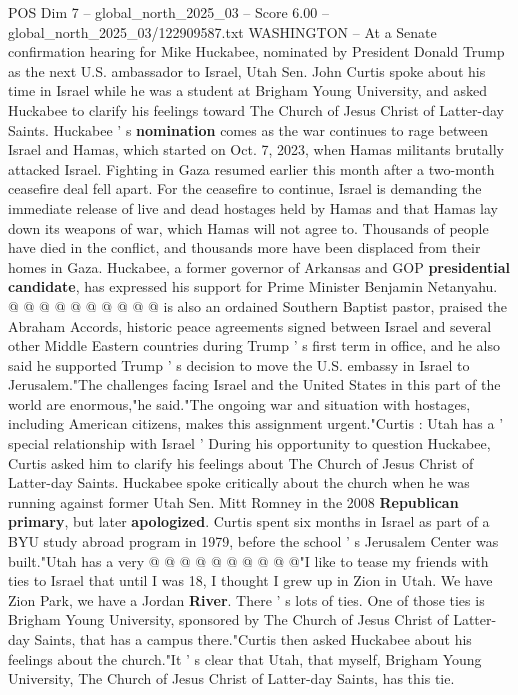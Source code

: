 \begin{textsample}{POS Dim 7 – global\_north\_2025\_03 – Score 6.00 – global\_north\_2025\_03/122909587.txt}  \label{ex:f7_pos_319}
WASHINGTON -- At a Senate confirmation hearing for Mike Huckabee, nominated by President Donald Trump as the next U.S. ambassador to Israel, Utah Sen.
John Curtis spoke about his time in Israel while he was a student at Brigham Young University, and asked Huckabee to clarify his feelings toward The Church of Jesus Christ of Latter-day Saints.
Huckabee ' s \textbf{nomination} comes as the war continues to rage between Israel and Hamas, which started on Oct. 7, 2023, when Hamas militants brutally attacked Israel.
Fighting in Gaza resumed earlier this month after a two-month ceasefire deal fell apart.
For the ceasefire to continue, Israel is demanding the immediate release of live and dead hostages held by Hamas and that Hamas lay down its weapons of war, which Hamas will not agree to.
Thousands of people have died in the conflict, and thousands more have been displaced from their homes in Gaza.
Huckabee, a former governor of Arkansas and GOP \textbf{presidential} \textbf{candidate}, has expressed his support for Prime Minister Benjamin Netanyahu. @ @ @ @ @ @ @ @ @ @ is also an ordained Southern Baptist pastor, praised the Abraham Accords, historic peace agreements signed between Israel and several other Middle Eastern countries during Trump ' s first term in office, and he also said he supported Trump ' s decision to move the U.S. embassy in Israel to Jerusalem."The challenges facing Israel and the United States in this part of the world are enormous,"he said."The ongoing war and situation with hostages, including American citizens, makes this assignment urgent."Curtis : Utah has a ' special relationship with Israel ' During his opportunity to question Huckabee, Curtis asked him to clarify his feelings about The Church of Jesus Christ of Latter-day Saints.
Huckabee spoke critically about the church when he was running against former Utah Sen.
Mitt Romney in the 2008 \textbf{Republican} \textbf{primary}, but later \textbf{apologized}.
Curtis spent six months in Israel as part of a BYU study abroad program in 1979, before the school ' s Jerusalem Center was built."Utah has a very @ @ @ @ @ @ @ @ @ @"I like to tease my friends with ties to Israel that until I was 18, I thought I grew up in Zion in Utah.
We have Zion Park, we have a Jordan \textbf{River}.
There ' s lots of ties.
One of those ties is Brigham Young University, sponsored by The Church of Jesus Christ of Latter-day Saints, that has a campus there."Curtis then asked Huckabee about his feelings about the church."It ' s clear that Utah, that myself, Brigham Young University, The Church of Jesus Christ of Latter-day Saints, has this tie.

\end{textsample}
